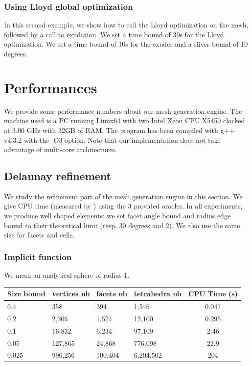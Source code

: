 

\subsubsection{Using Lloyd global optimization}

In this second example, we show how to call  the Lloyd optimization on the
mesh, followed by a call to exudation. We set a time bound of 30s for the Lloyd optimization. 
We set a  time bound of 10s for the exuder and a sliver bound of 10 degrees.






\section{Performances}

We provide some performance numbers about our mesh generation engine. The machine
used is a PC running Linux64 with two Intel Xeon CPU X5450 clocked at 3.00 GHz
with 32GB of RAM. The program has been compiled with g++ v4.3.2 with the -O3 option. 
Note that our implementation does not take advantage of multi-core
architectures.

\subsection{Delaunay refinement}

We study the refinement part of the mesh generation engine in this section. We
give CPU time (measured by ) using the 3 provided oracles. In all experiments, we produce well
shaped elements: we set facet angle bound and radius edge bound to their
theoretical limit (resp. 30 degrees and 2). We also use the same size for facets
and cells.

\subsubsection{Implicit function}

We mesh an analytical sphere of radius 1.

\begin{center}
\begin{tabular}{|l|l|l|l||c|}
  \hline
  Size bound & vertices nb & facets nb & tetrahedra nb & CPU Time (s) \\
  \hline
  0.4 & 358 & 394 & 1,546 & 0.047 \\
  0.2 & 2,306 & 1,524 & 12,100 & 0.295 \\
  0.1 & 16,832 & 6,234 & 97,109 & 2.46 \\
  0.05 & 127,865 & 24,868 & 776,098 & 22.9 \\
  0.025 & 996,256 & 100,404 & 6,204,502 & 204 \\
  \hline
\end{tabular}
\end{center}

